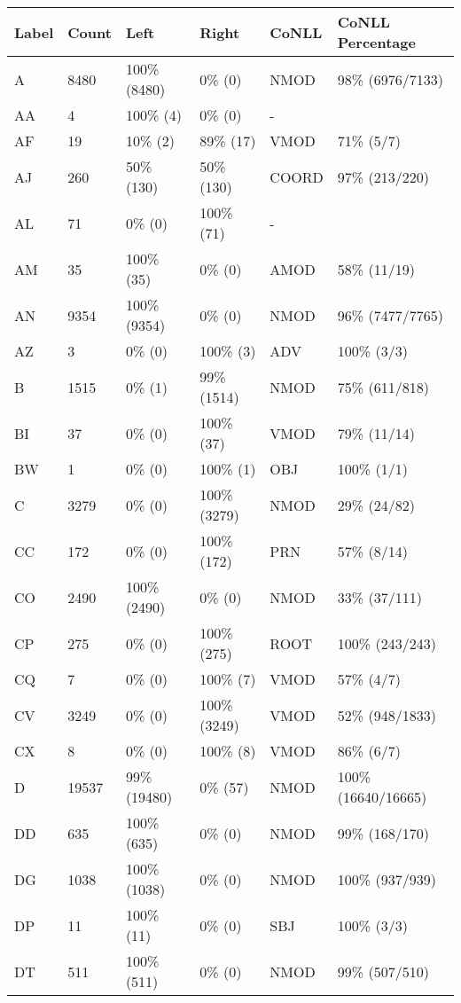 \begin{figure*}
\begin{tabular}{|l|l|l|l||l|l|}
\hline
Label & Count & Left & Right & CoNLL & CoNLL Percentage\\ 
\hline
 A & 8480 & 100\% (8480) & 0\% (0) & NMOD & 98\% (6976/7133) \\ 
\hline
 AA & 4 & 100\% (4) & 0\% (0) & - &  \\ 
\hline
 AF & 19 & 10\% (2) & 89\% (17) & VMOD & 71\% (5/7) \\ 
\hline
 AJ & 260 & 50\% (130) & 50\% (130) & COORD & 97\% (213/220) \\ 
\hline
 AL & 71 & 0\% (0) & 100\% (71) & - &  \\ 
\hline
 AM & 35 & 100\% (35) & 0\% (0) & AMOD & 58\% (11/19) \\ 
\hline
 AN & 9354 & 100\% (9354) & 0\% (0) & NMOD & 96\% (7477/7765) \\ 
\hline
 AZ & 3 & 0\% (0) & 100\% (3) & ADV & 100\% (3/3) \\ 
\hline
 B & 1515 & 0\% (1) & 99\% (1514) & NMOD & 75\% (611/818) \\ 
\hline
 BI & 37 & 0\% (0) & 100\% (37) & VMOD & 79\% (11/14) \\ 
\hline
 BW & 1 & 0\% (0) & 100\% (1) & OBJ & 100\% (1/1) \\ 
\hline
 C & 3279 & 0\% (0) & 100\% (3279) & NMOD & 29\% (24/82) \\ 
\hline
 CC & 172 & 0\% (0) & 100\% (172) & PRN & 57\% (8/14) \\ 
\hline
 CO & 2490 & 100\% (2490) & 0\% (0) & NMOD & 33\% (37/111) \\ 
\hline
 CP & 275 & 0\% (0) & 100\% (275) & ROOT & 100\% (243/243) \\ 
\hline
 CQ & 7 & 0\% (0) & 100\% (7) & VMOD & 57\% (4/7) \\ 
\hline
 CV & 3249 & 0\% (0) & 100\% (3249) & VMOD & 52\% (948/1833) \\ 
\hline
 CX & 8 & 0\% (0) & 100\% (8) & VMOD & 86\% (6/7) \\ 
\hline
 D & 19537 & 99\% (19480) & 0\% (57) & NMOD & 100\% (16640/16665) \\ 
\hline
 DD & 635 & 100\% (635) & 0\% (0) & NMOD & 99\% (168/170) \\ 
\hline
 DG & 1038 & 100\% (1038) & 0\% (0) & NMOD & 100\% (937/939) \\ 
\hline
 DP & 11 & 100\% (11) & 0\% (0) & SBJ & 100\% (3/3) \\ 
\hline
 DT & 511 & 100\% (511) & 0\% (0) & NMOD & 99\% (507/510) \\ 

\end{tabular}
\end{figure*}
